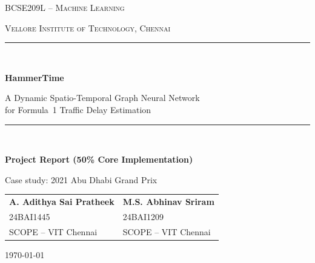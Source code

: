 \documentclass[11pt,a4paper]{article}
\newcommand{\authorAname}{A. Adithya Sai Pratheek}
\newcommand{\authorAreg}{24BAI1445}
\newcommand{\authorBname}{M.S. Abhinav Sriram}
\newcommand{\authorBreg}{24BAI1209}
\newcommand{\affil}{SCOPE -- VIT Chennai}
\begin{document}
\begin{titlepage}
\centering
\vspace*{1.2cm}
{\large \textsc{BCSE209L -- Machine Learning}\par}
{\large \textsc{Vellore Institute of Technology, Chennai}\par}
\vspace{1.6cm}
\rule{\linewidth}{1.2pt}\\[0.5cm]
{\Huge \bfseries HammerTime\par}
\vspace{0.3cm}
{\Large A Dynamic Spatio-Temporal Graph Neural Network\\for Formula~1 Traffic Delay Estimation\par}
\vspace{0.3cm}
\rule{\linewidth}{1.2pt}\\[1.0cm]
{\Large \textbf{Project Report (50\% Core Implementation)}\par}
\vspace{0.4cm}
{\large Case study: 2021 Abu Dhabi Grand Prix\par}
\vspace{2.2cm}

\begin{tabularx}{\linewidth}{XX}
\centering \textbf{\large \authorAname} & \centering \textbf{\large \authorBname} \tabularnewline[4pt]
\centering \authorAreg & \centering \authorBreg \tabularnewline[4pt]
\centering \affil & \centering \affil \tabularnewline
\end{tabularx}

\vfill
{\large \today}
\end{titlepage}
\end{document}
